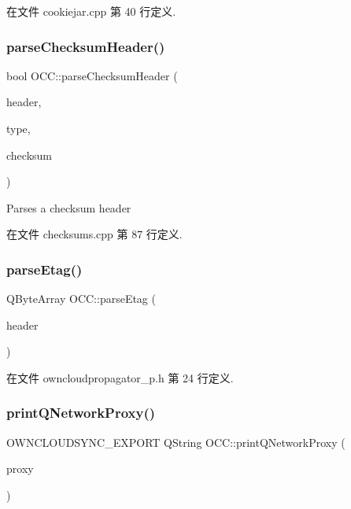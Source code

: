 在文件 cookiejar.\+cpp 第 40 行定义.

\mbox{\label{namespace_o_c_c_a4d9ed0cd51d8709a9253e00f2f203cab}} 
\subsubsection{\texorpdfstring{parse\+Checksum\+Header()}{parseChecksumHeader()}}
{\footnotesize\ttfamily bool O\+C\+C\+::parse\+Checksum\+Header (\begin{DoxyParamCaption}\item[{const Q\+Byte\+Array \&}]{header,  }\item[{Q\+Byte\+Array $\ast$}]{type,  }\item[{Q\+Byte\+Array $\ast$}]{checksum }\end{DoxyParamCaption})}



Parses a checksum header 



在文件 checksums.\+cpp 第 87 行定义.

\mbox{\label{namespace_o_c_c_aab916f8e5a0c4077c3e005b05f5b7a8c}} 
\subsubsection{\texorpdfstring{parse\+Etag()}{parseEtag()}}
{\footnotesize\ttfamily Q\+Byte\+Array O\+C\+C\+::parse\+Etag (\begin{DoxyParamCaption}\item[{const char $\ast$}]{header }\end{DoxyParamCaption})}



在文件 owncloudpropagator\+\_\+p.\+h 第 24 行定义.

\mbox{\label{namespace_o_c_c_a77a59794911e4e3a4515c279ac82477a}} 
\subsubsection{\texorpdfstring{print\+Q\+Network\+Proxy()}{printQNetworkProxy()}}
{\footnotesize\ttfamily O\+W\+N\+C\+L\+O\+U\+D\+S\+Y\+N\+C\+\_\+\+E\+X\+P\+O\+RT Q\+String O\+C\+C\+::print\+Q\+Network\+Proxy (\begin{DoxyParamCaption}\item[{const Q\+Network\+Proxy \&}]{proxy }\end{DoxyParamCaption})}



